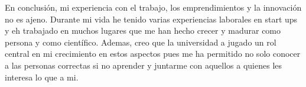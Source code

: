 \documentclass[12pt]{exam}
\begin{document}
En conclusión, mi experiencia con el trabajo, los emprendimientos y la innovación no es ajeno. Durante mi vida he tenido varias experiencias laborales en start ups y eh trabajado en muchos lugares que me han hecho crecer y madurar como persona y como científico. Ademas, creo que la universidad a jugado un rol central en mi crecimiento en estos aspectos pues me ha permitido no solo conocer a las personas correctas si no aprender y juntarme con aquellos a quienes les interesa lo que a mi.
\end{document}
